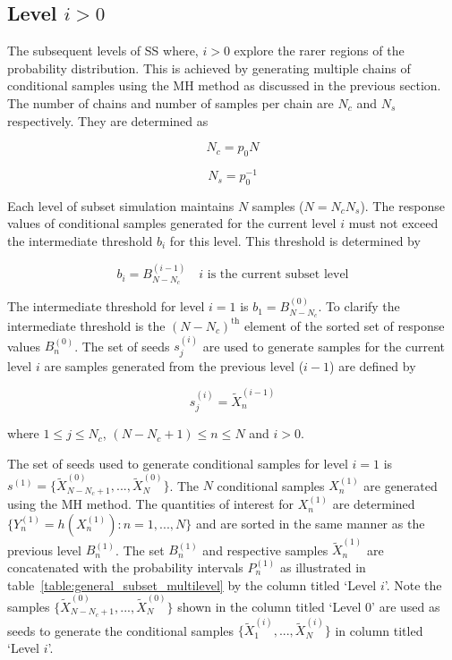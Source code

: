 \documentclass[journal]{IEEEtran}
\begin{document}
\subsection{Level $i > 0$}

The subsequent levels of SS where, $i > 0 $ explore the rarer regions of the probability distribution. This is achieved by generating multiple chains of conditional samples using the MH method as discussed in the previous section. The number of chains and number of samples per chain are $N_{c}$ and $N_s$ respectively. They are determined as

\begin{equation}	
	N_{c} = p_{0}N
\label{eq:n_c}
\end{equation}

\begin{equation}
	N_{s} = p_{0}^{-1}
\label{eq:n_s}
\end{equation}

\noindent Each level of subset simulation maintains $N$ samples ($N = N_{c} N_{s}$). The response values of conditional samples generated for the current level $i$ must not exceed the intermediate threshold $b_{i}$ for this level. This threshold is determined by

\begin{equation} 
	b_{i} = B_{N-N_c}^{(i-1)} \quad i \text{ is the current subset level}
	\label{eq:thresholds}
\end{equation}

\noindent The intermediate threshold for level $i = 1$ is $b_{1} = B_{N-N_{c}}^{(0)}$. To clarify the intermediate threshold is the $(N-N_{c})^{\text{th}}$ element of the sorted set of response values $B_{n}^{(0)}$. The set of seeds $s_{j}^{(i)}$ are used to generate samples for the current level $i$ are samples generated from the previous level ($i-1$) are defined by

\begin {equation}
	s_{j}^{(i)} = \tilde{X}_{n}^{(i-1)}
\label{eq:seeds}
\end{equation}

\noindent where $1 \leq j \leq N_{c}$, $(N-N_{c}+1) \leq n \leq N$ and $i > 0$. 

The set of seeds used to generate conditional samples for level $i = 1$ is $s^{(1)} = \{\tilde{X}_{N-N_{c}+1}^{(0)},...,\tilde{X}_{N}^{(0)}\}$. The $N$ conditional samples $X_{n}^{(1)}$ are generated using the MH method. The quantities of interest for $X_{n}^{(1)}$ are determined $\{Y_{n}^{(1)} = h(X_{n}^{(1)}): n = 1,...,N\}$ and are sorted in the same manner as the previous level $B_{n}^{(1)}$. The set $B_{n}^{(1)}$ and respective samples $\tilde{X}_{n}^{(1)}$ are concatenated with the probability intervals $P_{n}^{(1)}$ as illustrated in table~\ref{table:general_subset_multilevel} by the column titled `Level $i$'. Note the samples $\{\tilde{X}_{N-N_{c}+1}^{(0)},...,\tilde{X}_{N}^{(0)}\}$ shown in the column titled `Level 0' are used as seeds to generate the conditional samples $\{\tilde{X}_{1}^{(i)},...,\tilde{X}_{N}^{(i)}\}$ in column titled `Level $i$'.
\end{document}

